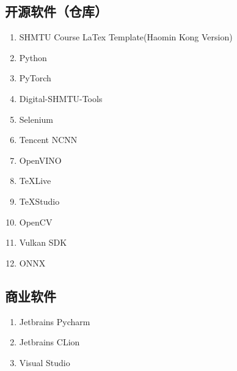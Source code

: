 \subsection{开源软件（仓库）}

\begin{enumerate}
	\item SHMTU Course LaTex Template(Haomin Kong Version)\cite{shmtu_course_latex_template}
	\item Python\cite{python}
	\item PyTorch\cite{pytorch}
	\item Digital-SHMTU-Tools\cite{digit_shmtu}
	\item Selenium\cite{selenium}
	\item Tencent NCNN\cite{ncnn}
	\item OpenVINO\cite{openvino}
	\item TeXLive\cite{texlive}
	\item TeXStudio\cite{texstudio}
	\item OpenCV\cite{opencv}
	\item Vulkan SDK\cite{vulkan-sdk}
	\item ONNX\cite{onnx}
\end{enumerate}

\subsection{商业软件}

\begin{enumerate}
	\item Jetbrains Pycharm\cite{jetbrains}
	\item Jetbrains CLion\cite{jetbrains}
	\item Visual Studio\cite{vs}
\end{enumerate}
